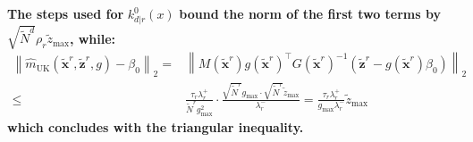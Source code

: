 \documentclass[preprint]{elsarticle}
\begin{document}
\textbf{The steps used for} $k^0_{d|r}(x)$ \textbf{bound the norm of the first two terms by} $\sqrt{\tilde{N}^d}\rho_r\tilde{z}_{\max}$\textbf{, while:}
\begin{equation*}
    \begin{aligned}
    \left\|\hat{m}_{\mathrm{UK}}(\tilde{\mathbf{x}}^r,\tilde{\mathbf{z}}^r,g)-\beta_0\right\|_2=&\left\|M(\tilde{\mathbf{x}}^r)g(\tilde{\mathbf{x}}^r)^\top G(\tilde{\mathbf{x}}^r)^{-1}\left(\tilde{\mathbf{z}}^r-g(\tilde{\mathbf{x}}^r)\beta_0\right)\right\|_2\\
    \leq&\frac{\tau_r\lambda_r^+}{\tilde{N}^rg_{\max}^2}\cdot\frac{\sqrt{\tilde{N}^r}g_{\max}\cdot\sqrt{\tilde{N}^r}\tilde{z}_{\max}}{\lambda_r^-}=\frac{\tau_r\lambda_r^+}{g_{\max}\lambda_r^-}\tilde{z}_{\max}
    \end{aligned}
\end{equation*}
\textbf{which concludes with the triangular inequality.}



\end{document}
